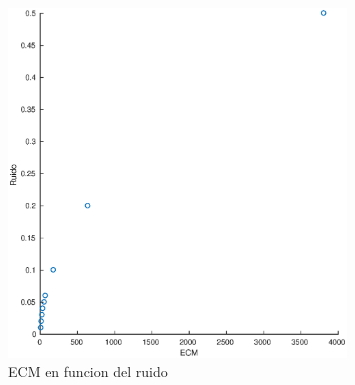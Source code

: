 \begin{figure}[H]
	\centering	\includegraphics[width=0.8\textwidth]{img/ruido_ecm}
	\caption{ECM en funcion del ruido}
	\label{fig:etiqueta}
\end{figure}